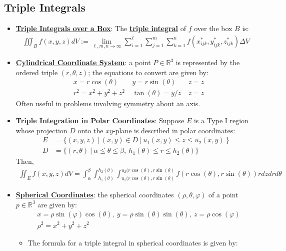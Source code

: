 \documentclass[reqno,11pt]{amsart}
\theoremstyle{definition}
\theoremstyle{remark}
\newcommand{\R}{\mathbb{R}}
\newcommand{\dfn}[1]{\underline{\textbf{#1}}}
\begin{document}
\subsection{Triple Integrals}
\begin{itemize}
	\item \dfn{Triple Integrals over a Box}: The \dfn{triple integral} of $f$ over the box $B$ is: 
	\begin{align}
		\iiint_B f(x,y,z) dV := \lim_{\ell, m, n \rightarrow \infty} \sum_{i=1}^\ell \sum_{j=1}^m \sum_{k=1}^n f(x_{ijk}^*, y_{ijk}^*, z_{ijk}^*) \Delta V	
	\end{align}
	\item \dfn{Cylindrical Coordinate System}: a point $P \in \R^3$ is represented by the ordered triple $(r, \theta, z)$; the equations to convert are given by: 
	\begin{align*}
		& x = r \cos (\theta)\ &  y = r \sin (\theta)\ & z = z \\
		& r^2 = x^2 + y^2 + z^2\	& \tan (\theta) = y/z\ & z = z 
	\end{align*} 
	Often useful in problems involving symmetry about an axis. 
	\item \dfn{Triple Integration in Polar Coordinates}: Suppose $E$ is a Type I region whose projection $D$ onto the $xy$-plane is described in polar coordinates: 
	\begin{align*}
		E & = \{ (x, y, z)\ |\ (x,y) \in D\ |\ u_1(x,y) \leq z \leq u_2(x,y)\ \} \\
		D & = \{ (r, \theta)\ |\ \alpha \leq \theta \leq \beta,\ h_1(\theta) \leq r \leq h_2(\theta) \} 	
	\end{align*}
	Then, 
	\begin{align}
		\iint_E f(x,y,z) dV = \int_\alpha^\beta \int_{h_1(\theta)}^{h_2(\theta)} \int_{u_1(r \cos (\theta), r \sin (\theta) }^{u_2(r \cos (\theta), r \sin (\theta)}	f (r \cos (\theta), r \sin (\theta)) r dz dr d \theta 
	\end{align}
	\item \dfn{Spherical Coordinates}: the spherical coordinates $(\rho, \theta, \varphi)$ of a point $p \in \R^3$ are given by: 
	\begin{align*} 
		& x = \rho \sin (\varphi) \cos (\theta),\ y = \rho \sin (\theta) \sin (\theta),\ z = \rho \cos (\varphi) \\
		& \rho^2 = x^2 + y^2 + z^2 	
	\end{align*} 
	\begin{itemize}[noitemsep]
		\item The formula for a triple integral in spherical coordinates is given by:

\end{itemize}
\end{itemize}
\end{document}
